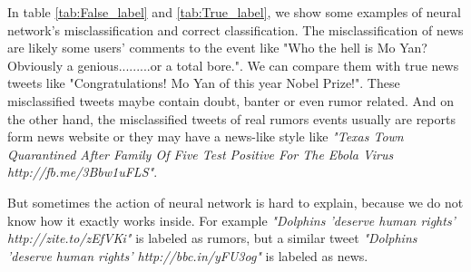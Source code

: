 In table \ref{tab:False_label} and \ref{tab:True_label}, we show some examples of neural network's misclassification and  correct classification. The misclassification of news are likely  some users' comments to the event like "Who the hell is Mo Yan? Obviously a genious.........or a total bore.". We can compare them with true news tweets like "Congratulations! Mo Yan of this year Nobel Prize!". These misclassified tweets maybe contain doubt, banter or even rumor related. And on the other hand, the misclassified tweets of real rumors events usually are reports form news website or they may have a news-like style like \emph{"Texas Town Quarantined After Family Of Five Test Positive For The Ebola Virus http://fb.me/3Bbw1uFLS"}.

But sometimes the action of neural network is hard to explain, because we do not know how it exactly works inside. For example \emph{"Dolphins 'deserve human rights' http://zite.to/zEfVKi"} is labeled as rumors, but a similar tweet \emph{"Dolphins 'deserve human rights' http://bbc.in/yFU3og"} is labeled as news.
 
